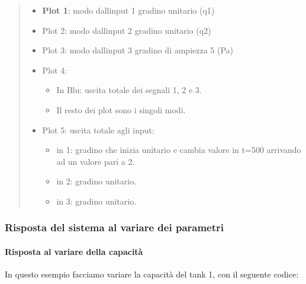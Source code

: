 \documentclass[
]{article}
\begin{document}
\begin{quote}
\begin{itemize}
\item
  \textbf{Plot 1}: modo dall\textquotesingle input 1 gradino unitario
  (q1)
\item
  Plot 2: modo dall\textquotesingle input 2 gradino unitario (q2)
\item
  Plot 3: modo dall\textquotesingle input 3 gradino di ampiezza 5 (Pa)
\item
  Plot 4:

  \begin{itemize}
  \item
    In Blu: uscita totale dei segnali 1, 2 e 3.
  \item
    Il resto dei plot sono i singoli modi.
  \end{itemize}
\item
  Plot 5: uscita totale agli input:

  \begin{itemize}
  \item
    in 1: gradino che inizia unitario e cambia valore in t=500 arrivando
    ad un valore pari a 2.
  \item
    in 2: gradino unitario.
  \item
    in 3: gradino unitario.
  \end{itemize}
\end{itemize}
\end{quote}

\hypertarget{risposta-del-sistema-al-variare-dei-parametri}{%
\subsubsection{Risposta del sistema al variare dei
parametri}\label{risposta-del-sistema-al-variare-dei-parametri}}

\hypertarget{risposta-al-variare-della-capacituxe0}{%
\paragraph{Risposta al variare della
capacità}\label{risposta-al-variare-della-capacituxe0}}

In questo esempio facciamo variare la capacità del tank 1, con il
seguente codice:
\end{document}
